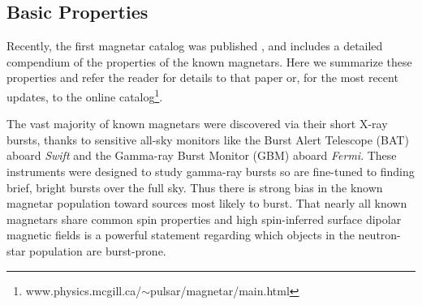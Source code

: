 
\subsection{Basic Properties}
\label{sec:basic}

Recently, the first magnetar catalog was published \citep[][hereafter OK14]{ok14}, and includes a detailed compendium of the properties
of the known magnetars.   Here we summarize these properties and refer the reader for details to that
paper or, for the most recent updates, to the online catalog\footnote{www.physics.mcgill.ca/$\sim$pulsar/magnetar/main.html}.

The vast majority of known magnetars were discovered via their short X-ray bursts, thanks to sensitive all-sky
monitors like the Burst Alert Telescope (BAT) aboard {\it Swift} and the Gamma-ray Burst Monitor (GBM) aboard {\it Fermi}.  These instruments
were designed to study gamma-ray bursts so are fine-tuned to finding brief, bright bursts over the full sky.  
Thus there is strong
bias in the known magnetar population toward sources most likely to burst.  
That nearly all known magnetars share common
spin properties and high spin-inferred surface dipolar magnetic fields is a powerful statement regarding which objects
in the neutron-star population are burst-prone.

